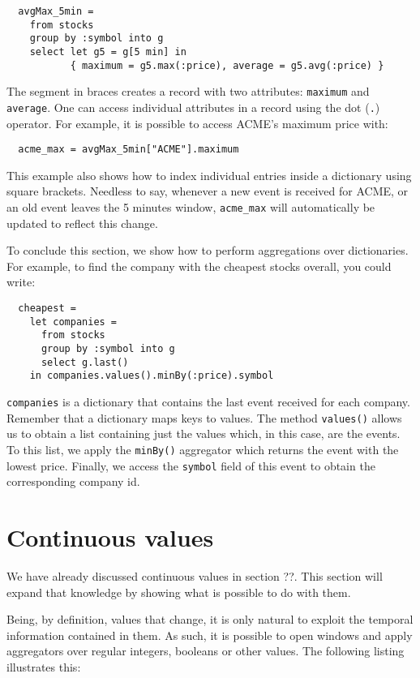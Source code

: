 \documentclass[a4,11pt]{report}
\begin{document}
\begin{lstlisting}
  avgMax_5min =
    from stocks
    group by :symbol into g
    select let g5 = g[5 min] in
           { maximum = g5.max(:price), average = g5.avg(:price) }
\end{lstlisting}

The segment in braces creates a record with two attributes:
\verb=maximum= and \verb=average=. One can access individual
attributes in a record using the dot (\verb=.=) operator. For example,
it is possible to access ACME's maximum price with:

\begin{lstlisting}
  acme_max = avgMax_5min["ACME"].maximum
\end{lstlisting}

This example also shows how to index individual entries inside a
dictionary using square brackets. Needless to say, whenever a new
event is received for ACME, or an old event leaves the 5 minutes
window, \verb=acme_max= will automatically be updated to reflect this
change.

To conclude this section, we show how to perform aggregations over
dictionaries. For example, to find the company with the cheapest
stocks overall, you could write:

\begin{lstlisting}
  cheapest =
    let companies =
      from stocks
      group by :symbol into g
      select g.last()
    in companies.values().minBy(:price).symbol
\end{lstlisting}

\verb=companies= is a dictionary that contains the last event received
for each company. Remember that a dictionary maps keys to values. The
method \verb=values()= allows us to obtain a list containing just the
values which, in this case, are the events. To this list, we apply the
\verb=minBy()= aggregator which returns the event with the lowest
price. Finally, we access the \verb=symbol= field of this event to
obtain the corresponding company id.

\section{Continuous values}

We have already discussed continuous values in section ??. This
section will expand that knowledge by showing what is possible to do
with them.

Being, by definition, values that change, it is only natural to
exploit the temporal information contained in them. As such, it is
possible to open windows and apply aggregators over regular integers,
booleans or other values. The following listing illustrates this:
\end{document}
